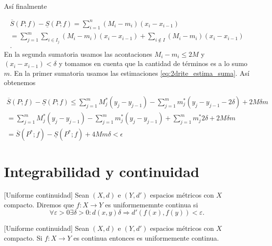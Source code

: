\begin{demo}
Así finalmente

\begin{multline*}\label{eq:crite2_cuentas}
 \overline{S}(P;f)-\underline{S}(P;f)=\sum_{i=1}^n(M_i-m_i)(x_i-x_{i-1})\\
 =\sum_{j=1}^m \sum_{i\in I_j}(M_i-m_i)(x_i-x_{i-1})+ \sum_{i\notin I}(M_i-m_i)(x_i-x_{i-1})\\  .
\end{multline*}
En la segunda sumatoria usamos las acontaciones $M_i-m_i\leq 2M$ y $(x_i-x_{i-1})<\delta$ y tomamos en cuenta que la cantidad de términos es a lo sumo $m$. En la primer sumatoria usamos las estimaciones \eqref{eq:2drite_estima_suma}. Así obtenemos

\begin{multline*}
 \overline{S}(P;f)-\underline{S}(P;f)
 \leq \sum_{j=1}^m  M^*_j(y_j-y_{j-1})-\sum_{j=1}^m  m^*_j(y_j-y_{j-1}-2\delta)+ 2M\delta m
 \\
 =\sum_{j=1}^m  M^*_j(y_j-y_{j-1})-\sum_{j=1}^m  m^*_j(y_j-y_{j-1})+ \sum_{j=1}^m m^*_j 2\delta +2M\delta m
 \\ 
 = \overline{S}(P^*;f)-\underline{S}(P^*;f)+4Mm\delta<\epsilon
\end{multline*}
 
\end{demo}



\section{Integrabilidad y continuidad}


\begin{definicion}{}[Uniforme continuidad]  Sean $(X,d)$ e $(Y,d')$ espacios métricos con $X$ compacto. Diremos que $f:X\to Y$ es uniformememnte continua si 
\[
 \forall\varepsilon>0\exists \delta>0:d(x,y)\delta\Rightarrow d'(f(x),f(y))<\varepsilon.
\]

 
\end{definicion}

\begin{teorema}{}[Uniforme continuidad] 
 Sean $(X,d)$ e $(Y,d')$ espacios métricos con $X$ compacto. Si $f:X\to Y$ es continua entonces es uniformemente continua.

\end{teorema}

